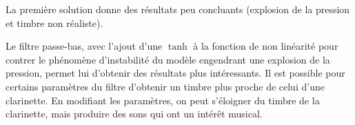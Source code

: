 La première solution donne des résultats peu concluants (explosion de la pression et timbre non réaliste). 

Le filtre passe-bas, avec l'ajout d'une $\tanh$ à la fonction de non linéarité pour contrer le phénomène d'instabilité du modèle engendrant une explosion de la pression, permet lui d'obtenir des résultats plus intéressants. Il est possible pour certains paramètres du filtre d'obtenir un timbre plus proche de celui d'une clarinette. En modifiant les paramètres, on peut s'éloigner du timbre de la clarinette, mais produire des sons qui ont un intérêt musical.

